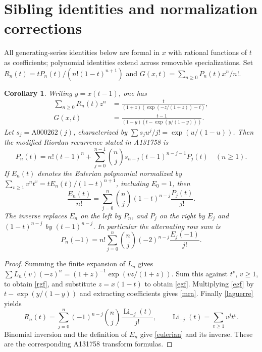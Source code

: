 \documentclass[11pt]{article}
\newtheorem{corollary}[theorem]{Corollary}
\begin{document}
\section{Sibling identities and normalization corrections}
All generating-series identities below are formal in $x$ with rational
functions of $t$ as coefficients; polynomial identities extend across
removable specializations. Set
$R_n(t)=tP_n(t)/(n!(1-t)^{n+1})$ and $G(x,t)=\sum_{n\geq0}P_n(t)x^n/n!$.
\begin{corollary}\label{transforms}
Writing $y=x(t-1)$, one has
\begin{align}
 \sum_{n\geq0}R_n(t)z^n
 &=\frac{t}{(1+z)(\exp(-z/(1+z))-t)},\label{rgf}\\
 G(x,t)&=\frac{t-1}{(1-y)(t-\exp(y/(1-y)))}.\label{egf}
\end{align}
Let $s_j=\mathrm{A000262}(j)$, characterized by
$\sum s_j u^j/j!=\exp(u/(1-u))$. Then the modified Riordan recurrence
stated in A131758 is
\begin{equation}\label{mra}
 P_n(t)=n!(t-1)^n+\sum_{j=0}^{n-1}\binom nj s_{n-j}
 (t-1)^{n-j-1}P_j(t)\quad(n\geq1).
\end{equation}
If $E_n(t)$ denotes the Eulerian polynomial normalized by
$\sum_{v\geq1}v^n t^v=tE_n(t)/(1-t)^{n+1}$, including $E_0=1$, then
\begin{equation}\label{eulerian}
 \frac{E_n(t)}{n!}=\sum_{j=0}^n\binom nj(1-t)^{n-j}\frac{P_j(t)}{j!}.
\end{equation}
The inverse replaces $E_n$ on the left by $P_n$, and $P_j$ on the right
by $E_j$ and $(1-t)^{n-j}$ by $(t-1)^{n-j}$. In particular the
alternating row sum is
\[
 P_n(-1)=n!\sum_{j=0}^n\binom nj(-2)^{n-j}\frac{E_j(-1)}{j!}.
\]
\end{corollary}
\begin{proof}
Summing the finite expansion of $L_n$ gives
$\sum L_n(v)(-z)^n=(1+z)^{-1}\exp(vz/(1+z))$.
Sum this against $t^v$, $v\geq1$, to obtain \eqref{rgf}, and substitute
$z=x(1-t)$ to obtain \eqref{egf}.
Multiplying \eqref{egf} by $t-\exp(y/(1-y))$ and extracting coefficients
gives \eqref{mra}. Finally \eqref{laguerre} yields
\[
 R_n(t)=\sum_{j=0}^n(-1)^{n-j}\binom nj
 \frac{\operatorname{Li}_{-j}(t)}{j!},\qquad
 \operatorname{Li}_{-j}(t)=\sum_{v\geq1}v^j t^v.
\]
Binomial inversion and the definition of $E_n$ give \eqref{eulerian}
and its inverse. These are the corresponding A131758 transform formulas.
\end{proof}
\end{document}
